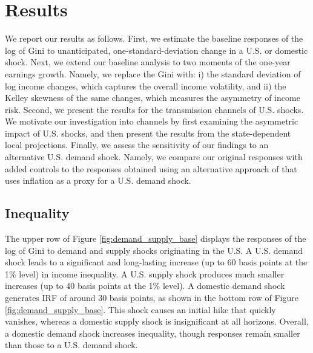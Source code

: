 \documentclass[12pt, a4paper]{article}
\begin{document}
\section{Results}
We report our results as follows. First, we estimate the baseline responses of the log of Gini to unanticipated, one-standard-deviation change in a U.S. or domestic shock. Next, we extend our baseline analysis to two moments of the one-year earnings growth. Namely, we replace the Gini with: i) the standard deviation of log income changes, which captures the overall income volatility, and ii) the Kelley skewness of the same changes, which measures the asymmetry of income risk. Second, we present the results for the transmission channels of U.S. shocks. We motivate our investigation into channels by first examining the asymmetric impact of U.S. shocks, and then present the results from the state-dependent local projections. Finally, we assess the sensitivity of our findings to an alternative U.S. demand shock. Namely, we compare our original responses with added controls to the responses obtained using an alternative approach of \textcite{bayoumi1992shocking} that uses inflation as a proxy for a U.S. demand shock.


\subsection{Inequality}
The upper row of Figure \ref{fig:demand_supply_base} displays the responses of the log of Gini to demand and supply shocks originating in the U.S. A U.S. demand shock leads to a significant and long-lasting increase (up to 60 basis points at the 1\% level) in income inequality. A U.S. supply shock produces much smaller increases (up to 40 basis points at the 1\% level). A domestic demand shock generates IRF of around 30 basis points, as shown in the bottom row of Figure \ref{fig:demand_supply_base}. This shock causes an initial hike that quickly vanishes, whereas a domestic supply shock is insignificant at all horizons. Overall, a domestic demand shock increases inequality, though responses remain smaller than those to a U.S. demand shock. 

\end{document}

